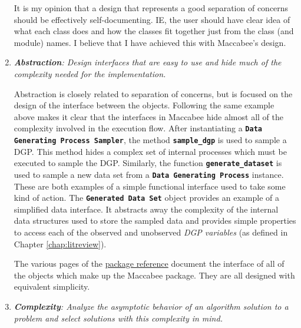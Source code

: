 \documentclass[../main.tex]{subfiles}
\begin{document}
\begin{enumerate}
    It is my opinion that a design that represents a good separation of concerns should be effectively self-documenting. IE, the user should have clear idea of what each class does and how the classes fit together just from the class (and module) names. I believe that I have achieved this with Maccabee's design.
    
    \item \textit{\textbf{Abstraction}: Design interfaces that are easy to use and hide much of the complexity needed for the implementation.}
    
    Abstraction is closely related to separation of concerns, but is focused on the design of the interface between the objects. Following the same example above makes it clear that the interfaces in Maccabee hide almost all of the complexity involved in the execution flow. After instantiating a \textbf{\texttt{Data Generating Process Sampler}}, the method \textbf{\lstinline{sample_dgp}} is used to sample a DGP. This method hides a complex set of internal processes which must be executed to sample the DGP. Similarly, the function \textbf{\lstinline{generate_dataset}} is used to sample a new data set from a \textbf{\texttt{Data Generating Process}} instance. These are both examples of a simple functional interface used to take some kind of action. The \textbf{\texttt{Generated Data Set}} object provides an example of a simplified data interface. It abstracts away the complexity of the internal data structures used to store the sampled data and provides simple properties to access each of the observed and unobserved \textit{DGP variables} (as defined in Chapter \ref{chap:litreview}).
    
    The various pages of the \href{\RTDurl/reference.html}{package reference} document the interface of all of the objects which make up the Maccabee package. They are all designed with equivalent simplicity.
    
    \item \textit{\textbf{Complexity}: Analyze the asymptotic behavior of an algorithm solution to a problem and select solutions with this complexity in mind.}
    

\end{enumerate}
\end{document}
